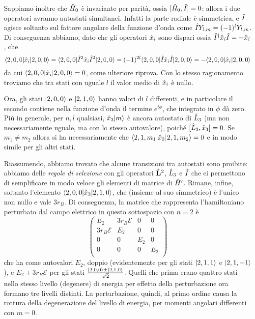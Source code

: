 Sappiamo inoltre che $\hat{H}_0$ è invariante per parità, ossia $[\hat{H}_0,\hat{I}]=0$: allora i due operatori avranno autostati simultanei.
Infatti la parte radiale è simmetrica, e $\hat{I}$ agisce soltanto sul fattore angolare della funzione d'onda come $\hat{I}Y_{l,m}=(-1)^lY_{l,m}$.
Di conseguenza abbiamo, dato che gli operatori $\hat{x}_i$ sono dispari ossia $\hat{I}^\dagger\hat{x}_i\hat{I}=-\hat{x}_i$, che
\begin{equation}
	\langle2,0,0\rvert\hat{x}_i\lvert2,0,0\rangle=
	\langle2,0,0\rvert\hat{I}^2\hat{x}_i\hat{I}^2\lvert2,0,0\rangle=
	(-1)^{2l}\langle2,0,0\rvert\hat{I}\hat{x}_i\hat{I}\lvert2,0,0\rangle=
	-\langle2,0,0\rvert\hat{x}_i\lvert2,0,0\rangle
\end{equation}
da cui $\langle2,0,0\rvert\hat{x}_i\lvert2,0,0\rangle=0$, come ulteriore riprova.
Con lo stesso ragionamento troviamo che tra stati con uguale $l$ il valor medio di $\hat{x}_i$ è nullo.

Ora, gli stati $\lvert2,0,0\rangle$ e $\lvert2,1,0\rangle$ hanno valori di $l$ differenti, e in particolare il secondo contiene nella funzione d'onda il termine $e^{i\phi}$, che integrato in $\phi$ dà zero.
Più in generale, per $n,l$ qualsiasi, $\hat{x}_3\lvert m\rangle$ è ancora autostato di $\hat{L}_3$ (ma non necessariamente uguale, ma con lo stesso autovalore), poich\'e $[\hat{L}_3,\hat{x}_3]=0$.
Se $m_1\ne m_2$ allora si ha necessariamente che $\langle2,1,m_1\rvert\hat{x}_3\lvert2,1,m_2\rangle=0$ e in modo simile per gli altri stati.

Riassumendo, abbiamo trovato che alcune transizioni tra autostati sono proibite: abbiamo delle \emph{regole di selezione} con gli operatori $\hat{\mathbf{L}}^2$, $\hat{L}_3$ e $\hat{I}$ che ci permettono di semplificare in modo veloce gli elementi di matrice di $\hat{H}'$.
Rimane, infine, soltanto l'elemento $\langle2,0,0\rvert\hat{x}_3\lvert2,1,0\rangle$, che (insieme al suo simmetrico) è l'unico non nullo e vale $3r_B$.
Di conseguenza, la matrice che rappresenta l'hamiltoniano perturbato dal campo elettrico in questo sottospazio con $n=2$ è
\begin{equation}
	\begin{pmatrix}
		E_2				&3r_B\mathcal E	&0		&0	\\
		3r_B\mathcal E	&E_2			&0		&0	\\
		0				&0				&E_2	&0	\\
		0				&0				&0		&E_2\\
	\end{pmatrix}
\end{equation}
che ha come autovalori $E_2$, doppio (evidentemente per gli stati $\lvert2,1,1\rangle$ e $\lvert2,1,-1\rangle$), e $E_2\pm 3r_B\mathcal E$ per gli stati $\frac{\lvert2,0,0\rangle\pm\lvert2,1,0\rangle}{\sqrt{2}}$.
Quelli che prima erano quattro stati nello stesso livello (degenere) di energia per effetto della perturbazione ora formano tre livelli distinti.
La perturbazione, quindi, al primo ordine causa la rottura della degenerazione del livello di energia, per momenti angolari differenti con $m=0$.

